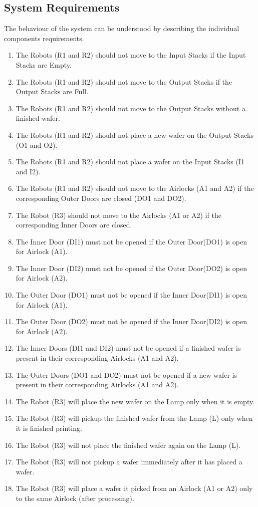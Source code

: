 \documentclass[a4paper,12pt]{article}
\begin{document}
\subsection{System Requirements}
The behaviour of the system can be understood by describing the individual components requirements.
\begin{enumerate}
\item The Robots (R1 and R2) should not move to the Input Stacks if the Input Stacks are Empty.

\item The Robots (R1 and R2) should not move to the Output Stacks if the Output Stacks are Full.
\item The Robots (R1 and R2) should not move to the Output Stacks without a finished wafer.
\item The Robots (R1 and R2) should not place a new wafer on the Output Stacks (O1 and O2).
\item The Robots (R1 and R2) should not place a wafer on the Input Stacks (I1 and I2).
\item The Robots (R1 and R2) should not move to the Airlocks (A1 and A2) if the corresponding Outer Doors are closed (DO1 and DO2).
\item The Robot (R3) should not move to the Airlocks (A1 or A2) if the corresponding Inner Doors are closed.
\item The Inner Door (DI1) must not be opened if the Outer Door(DO1) is open for Airlock (A1).
\item The Inner Door (DI2) must not be opened if the Outer Door(DO2) is open for Airlock (A2).
\item The Outer Door (DO1) must not be opened if the Inner Door(DI1) is open for Airlock (A1).
\item The Outer Door (DO2) must not be opened if the Inner Door(DI2) is open for Airlock (A2).
\item The Inner Doors (DI1 and DI2) must not be opened if a finished wafer is present in their corresponding Airlocks (A1 and A2).
\item The Outer Doors (DO1 and DO2) must not be opened if a new wafer is present in their corresponding Airlocks (A1 and A2).
\item The Robot (R3) will place the new wafer on the Lamp only when it is empty.
\item The Robot (R3) will pickup the finished wafer from the Lamp (L) only when it is finished printing.
\item The Robot (R3) will not place the finished wafer again on the Lamp (L).
\item The Robot (R3) will not pickup a wafer immediately after it has placed a wafer.
\item The Robot (R3) will place a wafer it picked from an Airlock (A1 or A2) only to the same Airlock (after processing). 
\end{enumerate}
\newpage
\end{document}

